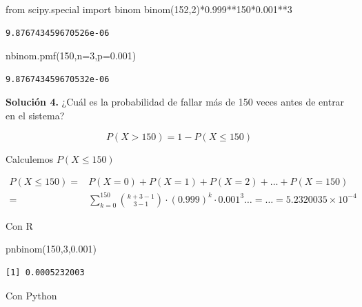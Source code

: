 \documentclass[
  letterpaper,
  DIV=11,
  numbers=noendperiod]{scrreprt}
\newenvironment{Shaded}{\begin{snugshade}}{\end{snugshade}}
\newcommand{\DecValTok}[1]{\textcolor[rgb]{0.68,0.00,0.00}{#1}}
\newcommand{\FloatTok}[1]{\textcolor[rgb]{0.68,0.00,0.00}{#1}}
\newcommand{\FunctionTok}[1]{\textcolor[rgb]{0.28,0.35,0.67}{#1}}
\newcommand{\ImportTok}[1]{\textcolor[rgb]{0.00,0.46,0.62}{#1}}
\newcommand{\NormalTok}[1]{\textcolor[rgb]{0.00,0.23,0.31}{#1}}
\newcommand{\OperatorTok}[1]{\textcolor[rgb]{0.37,0.37,0.37}{#1}}
\begin{document}
\begin{Shaded}
\begin{Highlighting}[]
\ImportTok{from}\NormalTok{  scipy.special }\ImportTok{import}\NormalTok{ binom}
\NormalTok{binom(}\DecValTok{152}\NormalTok{,}\DecValTok{2}\NormalTok{)}\OperatorTok{*}\FloatTok{0.999}\OperatorTok{**}\DecValTok{150}\OperatorTok{*}\FloatTok{0.001}\OperatorTok{**}\DecValTok{3}
\end{Highlighting}
\end{Shaded}

\begin{verbatim}
9.876743459670526e-06
\end{verbatim}

\begin{Shaded}
\begin{Highlighting}[]
\NormalTok{nbinom.pmf(}\DecValTok{150}\NormalTok{,n}\OperatorTok{=}\DecValTok{3}\NormalTok{,p}\OperatorTok{=}\FloatTok{0.001}\NormalTok{)}
\end{Highlighting}
\end{Shaded}

\begin{verbatim}
9.876743459670532e-06
\end{verbatim}

\textbf{Solución 4.} ¿Cuál es la probabilidad de fallar más de 150 veces
antes de entrar en el sistema?

\[P(X>150)=1-P(X\leq 150)\]

Calculemos \(P(X\leq 150)\)

\begin{align*}
P(X\leq 150) =& P(X=0)+P(X=1)+P(X=2)+\ldots+P(X=150)\\
=& \sum_{k=0}^{150} {k+3-1\choose 3-1} \cdot (0.999)^{k}\cdot 0.001^3\ldots 
= \ldots =\ensuremath{5.2320035\times 10^{-4}}
\end{align*}

Con R

\begin{Shaded}
\begin{Highlighting}[]
\FunctionTok{pnbinom}\NormalTok{(}\DecValTok{150}\NormalTok{,}\DecValTok{3}\NormalTok{,}\FloatTok{0.001}\NormalTok{)}
\end{Highlighting}
\end{Shaded}

\begin{verbatim}
[1] 0.0005232003
\end{verbatim}

Con Python
\end{document}
